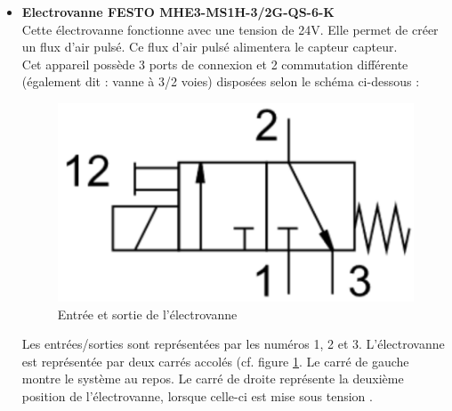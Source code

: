 \begin{itemize}
          Sur le figure \ref{fig:calibration}, nous pouvons observer la tension mesurée en fonction d'un certain débit d'air. Les paramètres utilisés
          pour cette calibration sont les suivants :
          \begin{itemize}
              \item Sortie analogique en tension sur une plage de 0V à 10V
              \item Full Scale allant de 0\% à +100\%
          \end{itemize}

          Le graphe montre une fonction linéaire qui se rapproche très fortement de la fonction $y = x$ (f$_{mesur\acute{e}}$(x) = 1.0004x - 0.0038).\\

    \item \textbf{Electrovanne FESTO MHE3-MS1H-3/2G-QS-6-K}\\
          Cette électrovanne fonctionne avec une tension de 24V.  Elle permet de créer un flux d'air pulsé. Ce flux d'air pulsé alimentera le
          capteur \gls{capteur}.\\
          Cet appareil possède 3 ports de connexion et 2 commutation différente (également dit : vanne à 3/2 voies) disposées selon le schéma ci-dessous :
          \begin{figure}[H]
              \centering
              \includegraphics[scale = 0.3]{assets/figures/Electrovanne_InOutput.png}
              \caption{Entrée et sortie de l'électrovanne}
              \label{fig:electrovanne_InOutput}
          \end{figure}
          Les entrées/sorties sont représentées par les numéros 1, 2 et 3. L'électrovanne est représentée par deux carrés accolés (cf. figure
          \ref*{fig:electrovanne_InOutput}. Le carré de gauche montre le système au repos. Le carré de droite représente la deuxième position de
          l'électrovanne, lorsque celle-ci est mise sous tension \cite{mimwebsite}.


\end{itemize}

